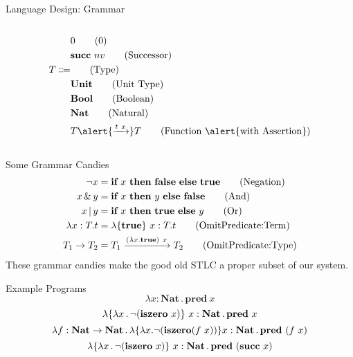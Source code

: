 \documentclass[handout]{beamer}
\begin{document}
\begin{frame}{Language Design: Grammar}
\begin{columns}
\begin{column}{0.5\textwidth}
\begin{align*}
        & 0                                 \tag{0} \\
        & \textbf{succ} \ nv                \tag{Successor} \\
    T \Coloneqq &                          \tag{Type} \\
        & \textbf{Unit}                    \tag{Unit Type} \\
        & \textbf{Bool}                    \tag{Boolean} \\
        & \textbf{Nat}                     \tag{Natural} \\
        & T \alert{\xrightarrow{t \ x}} T  \tag{Function \alert{with Assertion}}
\end{align*}
\end{column}
\end{columns}

\end{frame}

\begin{frame}{Some Grammar Candies}
    \begin{align*}
        \neg x &= \textbf{if} \ x \ \textbf{then} \ \textbf{false} \ \textbf{else} \ \textbf{true} \tag{Negation} \\
        x \operatorname{\&} y &= \textbf{if} \ x \ \textbf{then} \ y \ \textbf{else} \ \textbf{false} \tag{And} \\
        x \operatorname{|} y &= \textbf{if} \ x \ \textbf{then} \ \textbf{true} \ \textbf{else} \ y \tag{Or} \\
        \lambda x : T . t &= \lambda \qty{\textbf{true}} \ x : T . t \tag{OmitPredicate:Term} \\
        T_1 \to T_2 &= T_1 \xrightarrow{(\lambda x . \textbf{true}) \ x} T_2 \tag{OmitPredicate:Type}
    \end{align*}
    These grammar candies make the good old STLC a proper subset of our system.
\end{frame}

\begin{frame}{Example Programs}
    \[
        \lambda x : \textbf{Nat} \operatorname. \textbf{pred} \ x
    \] \pause
    \[
        \lambda \qty{\lambda x \operatorname. \neg (\textbf{iszero} \ x)} \ x : \textbf{Nat} \operatorname. \textbf{pred} \ x
    \] \pause
    \[
        \lambda f : \textbf{Nat} \to \textbf{Nat} \operatorname. \lambda \qty{\lambda x . \neg(\textbf{iszero} (f \ x))} x : \textbf{Nat} \operatorname. \textbf{pred} \ (f \ x)
    \] \pause
    \[
        \lambda \qty{\lambda x \operatorname. \neg (\textbf{iszero} \ x)} \ x : \textbf{Nat} \operatorname. \textbf{pred} \ (\textbf{succ} \ x)
    \]
\end{frame}
\end{document}

